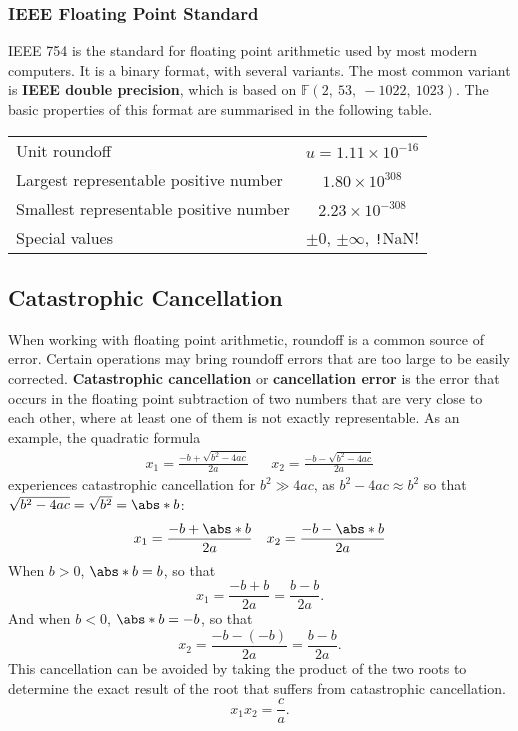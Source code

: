 \documentclass{article}
\begin{document}
\subsubsection{IEEE Floating Point Standard}
IEEE 754 is the standard for floating point arithmetic used by most
modern computers. It is a binary format, with several variants. The
most common variant is \textbf{IEEE double precision}, which is based
on \(\mathbb{F}\left( 2,\: 53,\: -1022,\: 1023 \right)\). The basic
properties of this format are summarised in the following table.
\begin{table}[H]
    \centering
    \begin{tabular}{l | c} %
        \toprule
        Unit roundoff                          & \(u = 1.11 \times 10^{-16}\)                      \\
        Largest representable positive number  & \(1.80 \times 10^{308}\)                          \\
        Smallest representable positive number & \(2.23 \times 10^{-308}\)                         \\
        Special values                         & \(\pm 0\), \(\pm \infty\), \texttt!NaN! \\ %
        \bottomrule
    \end{tabular}
\end{table}
\subsection{Catastrophic Cancellation}
When working with floating point arithmetic, roundoff is a common
source of error. Certain operations may bring roundoff errors that are
too large to be easily corrected. \textbf{Catastrophic cancellation} or
\textbf{cancellation error} is the error that occurs in the floating
point subtraction of two numbers that are very close to each other,
where at least one of them is not exactly representable. As an example,
the quadratic formula
\begin{align*}
    x_1 = \frac{-b + \sqrt{b^2 - 4 a c}}{2 a} &  & x_2 = \frac{-b - \sqrt{b^2 - 4 a c}}{2 a}
\end{align*}
experiences catastrophic cancellation for \(b^2 \gg 4ac\), as \(b^2 - 4ac \approx b^2\) so that
\(\sqrt{b^2 - 4ac} = \sqrt{b^2} = \abs*{b}\):
\begin{align*}
    x_1 = \frac{-b + \abs*{b}}{2 a} &  & x_2 = \frac{-b - \abs*{b}}{2 a}
\end{align*}
When \(b > 0\), \(\abs*{b} = b\), so that
\begin{equation*}
    x_1 = \frac{-b + b}{2a} = \frac{b - b}{2a}.
\end{equation*}
And when \(b < 0\), \(\abs*{b} = -b\), so that
\begin{equation*}
    x_2 = \frac{-b - \left( -b \right)}{2a} = \frac{b - b}{2a}.
\end{equation*}
This cancellation can be avoided by taking the product of the two roots
to determine the exact result of the root that suffers from catastrophic
cancellation.
\begin{equation*}
    x_1 x_2 = \frac{c}{a}.
\end{equation*}
\end{document}
